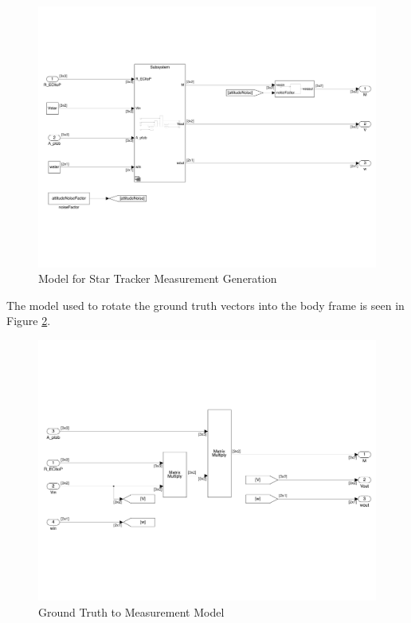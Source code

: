 \begin{figure}[H]
    \centering
    \captionsetup{ justification = centering }
    \includegraphics[trim={0.25cm 3cm 0.25cm 3cm},clip,width = 15cm]{Images/PS6/raw_meas_star.png}
    \caption{Model for Star Tracker Measurement Generation}
    \label{fig:star_tracker_meas}
\end{figure}

The model used to rotate the ground truth vectors into the body frame is seen in Figure \ref{fig:ground_truth_to_meas}.

\begin{figure}[H]
    \centering
    \captionsetup{ justification = centering }
    \includegraphics[trim={0.25cm 3cm 0.25cm 3cm},clip,width = 15cm]{Images/PS6/ground_truth_to_meas.png}
    \caption{Ground Truth to Measurement Model}
    \label{fig:ground_truth_to_meas}
\end{figure}


